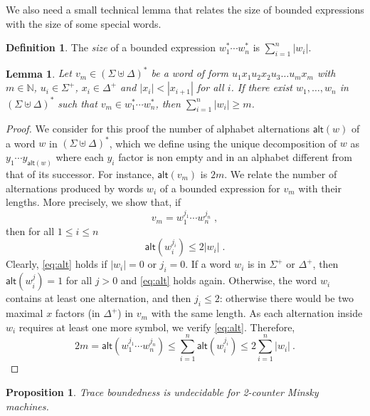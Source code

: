 \documentclass[11pt,reqno,a4paper]{amsart}
\theoremstyle{plain}
\newtheorem{lemma}[theorem]{Lemma}
\newtheorem{proposition}[theorem]{Proposition}
\theoremstyle{definition}
\newtheorem{definition}[theorem]{Definition}
\theoremstyle{remark}
\providecommand{\qedhere}{\qed}
\begin{document}
We also need a small technical lemma that relates the size of bounded
expressions with the size of some special words.
\begin{definition}
  The \emph{size} of a bounded expression $w_1^\ast\cdots w_n^\ast$ is
  $\sum_{i=1}^n|w_i|$. 
\end{definition}
\begin{lemma}\label{lem:lowb}
  Let $v_m\in(\Sigma\uplus\Delta)^\ast$ be a word of form
  $u_1x_1u_2x_2u_3\dots u_mx_m$ with
  $m\in\mathbb{N}$, $u_i\in\Sigma^+$, $x_i\in\Delta^+$ and
  $|x_i|<|x_{i+1}|$ for all $i$.  If there exist
  $w_1,\dots,w_n$ in $(\Sigma\uplus\Delta)^\ast$ such that
  $v_m\in w_1^\ast\cdots w_n^\ast$, then $\sum_{i=1}^n|w_i|\geq m$. 
\end{lemma}
\newcommand{\alt}{\mathsf{alt}}
\begin{proof}
  We consider for this proof the number of alphabet alternations $\alt(w)$ of
  a word $w$ in $(\Sigma\uplus\Delta)^\ast$, which we define using the
  unique decomposition of $w$ as $y_1\cdots y_{\alt(w)}$ where each $y_i$
  factor is non empty and in an alphabet different from that of its 
  successor.  For instance, $\alt(v_m)$ is $2m$.  We relate the number of
  alternations produced by words $w_i$ of a bounded expression for $v_m$
  with their lengths.  More precisely, we show that, if
  \begin{equation*}
    v_m=w_1^{j_1}\cdots w_n^{j_n}\;,
  \end{equation*}
  then for all $1\leq i\leq n$
  \begin{equation}\label{eq:alt}
    \alt(w_i^{j_i})\leq 2|w_i|\;.
  \end{equation}
  Clearly, \eqref{eq:alt} holds if $|w_i|=0$ or $j_i=0$.  If a word $w_i$ is in
  $\Sigma^+$ or $\Delta^+$, then $\alt(w_i^j)=1$ for all $j>0$ and
  \eqref{eq:alt} holds again.  Otherwise, the word $w_i$ contains at
  least one alternation, and then $j_i\leq 2$:
  otherwise there would be two maximal $x$ factors (in $\Delta^+$) in
  $v_m$ with the same length.  As each alternation inside
  $w_i$ requires at least one more symbol, we verify \eqref{eq:alt}.
  Therefore,
  \begin{equation*}
    2m = \alt(w_1^{j_1}\cdots w_n^{j_n})\leq \sum_{i=1}^n\alt(w_i^{j_i})\leq
    2\sum_{i=1}^n|w_i|\:.\tag*{\qedhere}
  \end{equation*}
\end{proof}
\begin{proposition}\label{propminsky}
  Trace boundedness is undecidable for 2-counter Minsky machines.
\end{proposition}
\end{document}
